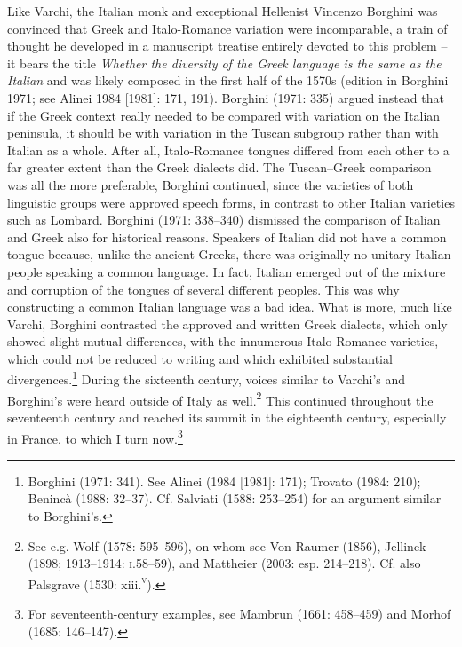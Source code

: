 \documentclass[12pt]{article}
\newenvironment{styleStandard}{\renewcommand\baselinestretch{1.25}\setlength\leftskip{0in}\setlength\rightskip{0in}\setlength\parindent{0.1972in}\setlength\parfillskip{0pt plus 1fil}\setlength\parskip{0in plus 1pt}\writerlistparindent\writerlistleftskip\leavevmode\normalfont\normalsize\writerlistlabel\ignorespaces}{\unskip\vspace{0in plus 1pt}\par}
\newcommand\writerlistleftskip{}
\newcommand\writerlistparindent{}
\newcommand\writerlistlabel{}
\begin{document}
\begin{styleStandard}
Like Varchi, the Italian monk and exceptional Hellenist Vincenzo Borghini was convinced that Greek and Italo-Romance variation were incomparable, a train of thought he developed in a manuscript treatise entirely devoted to this problem – it bears the title \textit{Whether the diversity of the Greek language is the same as the Italian} and was likely composed in the first half of the 1570s (edition in Borghini 1971; see Alinei 1984 [1981]: 171, 191). Borghini (1971: 335) argued instead that if the Greek context really needed to be compared with variation on the Italian peninsula, it should be with variation in the Tuscan subgroup rather than with Italian as a whole. After all, Italo-Romance tongues differed from each other to a far greater extent than the Greek dialects did. The Tuscan–Greek comparison was all the more preferable, Borghini continued, since the varieties of both linguistic groups were approved speech forms, in contrast to other Italian varieties such as Lombard. Borghini (1971: 338–340) dismissed the comparison of Italian and Greek also for historical reasons. Speakers of Italian did not have a common tongue because, unlike the ancient Greeks, there was originally no unitary Italian people speaking a common language. In fact, Italian emerged out of the mixture and corruption of the tongues of several different peoples. This was why constructing a common Italian language was a bad idea. What is more, much like Varchi, Borghini contrasted the approved and written Greek dialects, which only showed slight mutual differences, with the innumerous Italo-Romance varieties, which could not be reduced to writing and which exhibited substantial divergences.\footnote{ Borghini (1971: 341). See Alinei (1984 [1981]: 171); Trovato (1984: 210); Benincà (1988: 32–37). Cf. Salviati (1588: 253–254) for an argument similar to Borghini’s.} During the sixteenth century, voices similar to Varchi’s and Borghini’s were heard outside of Italy as well.\footnote{ See e.g. Wolf (1578: 595–596), on whom see Von Raumer (1856), Jellinek (1898; 1913–1914: \textsc{i}.58–59), and Mattheier (2003: esp. 214–218). Cf. also Palsgrave (1530: xiii.\textsc{\textsuperscript{v}}).} This continued throughout the seventeenth century and reached its summit in the eighteenth century, especially in France, to which I turn now.\footnote{ For seventeenth-century examples, see Mambrun (1661: 458–459) and Morhof (1685: 146–147).}
\end{styleStandard}
\end{document}

